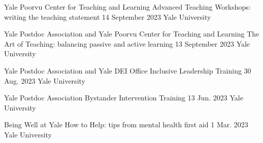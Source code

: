 \begin{cventries}

  \cventry
    {Yale Poorvu Center for Teaching and Learning} %
    {Advanced Teaching Workshops: writing the teaching statement} %
    {14 September 2023} %
    {Yale University} %
    {
    }

  \cventry
    {Yale Postdoc Association and Yale Poorvu Center for Teaching and Learning} %
    {The Art of Teaching: balancing passive and active learning} %
    {13 September 2023} %
    {Yale University} %
    {
    }       

  \cventry
    {Yale Postdoc Association and Yale DEI Office} %
    {Inclusive Leadership Training} %
    {30 Aug. 2023} %
    {Yale University} %
    {
    }

  \cventry
    {Yale Postdoc Association} %
    {Bystander Intervention Training} %
    {13 Jun. 2023} %
    {Yale University} %
    {
    }

  \cventry
    {Being Well at Yale} %
    {How to Help: tips from mental health first aid} %
    {1 Mar. 2023} %
    {Yale University} %
    {
    }


\end{cventries}
